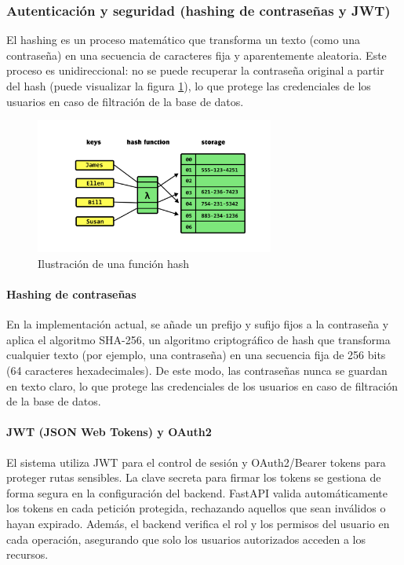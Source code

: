 \documentclass[12pt, a4paper]{article}
\begin{document}
\subsubsection{Autenticación y seguridad (hashing de contraseñas y JWT)}

El hashing es un proceso matemático que transforma un texto (como una contraseña) en una secuencia de caracteres fija y aparentemente aleatoria. Este proceso es unidireccional: no se puede recuperar la contraseña original a partir del hash (puede visualizar la figura \ref{fig:hash}), lo que protege las credenciales de los usuarios en caso de filtración de la base de datos.


\begin{figure}[htbp]
	\centering
	\includegraphics[width=0.7\textwidth]{images/hash.png}
	\caption[Ejemplo]{Ilustración de una función hash }
	\label{fig:hash}
\end{figure}
\vspace{-10pt}

\paragraph{Hashing de contraseñas}
En la implementación actual, se añade un prefijo y sufijo fijos a la contraseña y aplica el algoritmo SHA-256, un algoritmo criptográfico de hash que transforma cualquier texto (por ejemplo, una contraseña) en una secuencia fija de 256 bits (64 caracteres hexadecimales). De este modo, las contraseñas nunca se guardan en texto claro, lo que protege las credenciales de los usuarios en caso de filtración de la base de datos.

\paragraph{JWT (JSON Web Tokens) y OAuth2}
El sistema utiliza JWT para el control de sesión y OAuth2/Bearer tokens para proteger rutas sensibles. La clave secreta para firmar los tokens se gestiona de forma segura en la configuración del backend. FastAPI valida automáticamente los tokens en cada petición protegida, rechazando aquellos que sean inválidos o hayan expirado. Además, el backend verifica el rol y los permisos del usuario en cada operación, asegurando que solo los usuarios autorizados acceden a los recursos.
\end{document}
